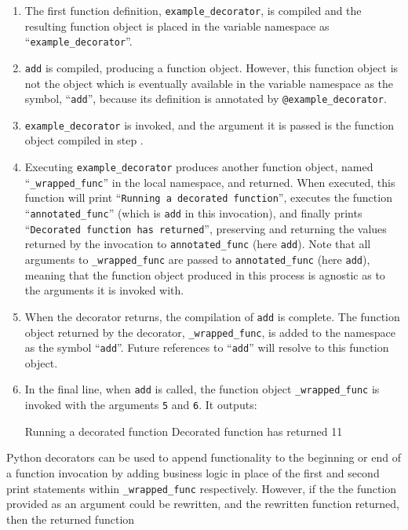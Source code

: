 \begin{enumerate}
    \item The first function definition, \lstinline{example_decorator}, is
    compiled and the resulting function object is placed in the variable
    namespace as ``\lstinline{example_decorator}''.
    \item \lstinline{add} is compiled, producing a function object. However,
    this function object is not the object which is eventually available in the
    variable namespace as the symbol, ``\lstinline{add}'', because its
    definition is annotated by \lstinline{@example_decorator}.
    \item \lstinline{example_decorator} is invoked, and the argument it is
    passed is the function object compiled in step .
    \item Executing \lstinline{example_decorator} produces another function
    object, named ``\lstinline{_wrapped_func}'' in the local namespace, and
    returned. When executed, this function will print
    ``\lstinline{Running a decorated function}'',
    executes the function ``\lstinline{annotated_func}''
    (which is \lstinline{add} in this invocation), and finally prints
    ``\lstinline{Decorated function has returned}'', preserving and returning
    the values returned by the invocation to \lstinline{annotated_func} (here
    \lstinline{add}). Note that all arguments to \lstinline{_wrapped_func} are
    passed to \lstinline{annotated_func} (here \lstinline{add}), meaning that
    the function object produced in this process is agnostic as to the arguments
    it is invoked with.
    \item When the decorator returns, the compilation of \lstinline{add} is
    complete. The function object returned by the decorator,
    \lstinline{_wrapped_func}, is added to the namespace as the symbol
    ``\lstinline{add}''. Future references to ``\lstinline{add}'' will resolve
    to this function object.
    \item In the final line, when \lstinline{add} is called, the function
    object \lstinline{_wrapped_func} is invoked with the arguments \lstinline{5}
    and \lstinline{6}. It outputs: \begin{blockquote}
    Running a decorated function
    Decorated function has returned
    11
    \end{blockquote}
\end{enumerate}

Python decorators can be used to append functionality to the beginning or end of
a function invocation by adding business logic in place of the first and second
print statements within \lstinline{_wrapped_func} respectively. However, if the
the function provided as an argument could be rewritten, and the rewritten
function returned, then the returned function 

